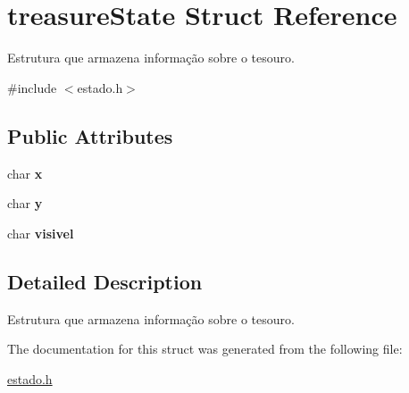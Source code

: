\hypertarget{structtreasureState}{}\section{treasure\+State Struct Reference}
\label{structtreasureState}


Estrutura que armazena informação sobre o tesouro.  




{\ttfamily \#include $<$estado.\+h$>$}

\subsection*{Public Attributes}
\begin{DoxyCompactItemize}
\item 
char {\bfseries x}\hypertarget{structtreasureState_acd91a86f6567d2ffac7b2a8c35ecfe28}{}\label{structtreasureState_acd91a86f6567d2ffac7b2a8c35ecfe28}

\item 
char {\bfseries y}\hypertarget{structtreasureState_a60c45acc4f6ed888fbf5d75324d8789f}{}\label{structtreasureState_a60c45acc4f6ed888fbf5d75324d8789f}

\item 
char {\bfseries visivel}\hypertarget{structtreasureState_a4a72a22f2d740642fc016d7bb4bb3c0b}{}\label{structtreasureState_a4a72a22f2d740642fc016d7bb4bb3c0b}

\end{DoxyCompactItemize}


\subsection{Detailed Description}
Estrutura que armazena informação sobre o tesouro. 

The documentation for this struct was generated from the following file\+:\begin{DoxyCompactItemize}
\item 
\hyperlink{estado_8h}{estado.\+h}\end{DoxyCompactItemize}
